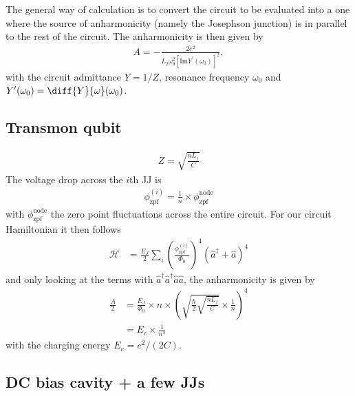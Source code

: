 The general way of calculation is to convert the circuit to be evaluated into a one where the source of anharmonicity (namely the Josephson junction) is in parallel to the rest of the circuit.
The anharmonicity is then given by
\begin{align}
A=-\frac{2e^2}{L_j\omega_0^2\left[\text{Im} Y^\prime(\omega_0)\right]^2},
\end{align}
with the circuit admittance $Y=1/Z$, resonance frequency $\omega_0$ and $Y^\prime(\omega_0)=\diff{Y}{\omega}(\omega_0)$.

\subsection{Transmon qubit}

\begin{align}
Z=\sqrt{\frac{nL_j}{C}}
\end{align}
The voltage drop across the $i$th JJ is
\begin{align}
\phi_\text{zpf}^{(i)} = \frac{1}{n}\times\phi_\text{zpf}^\text{node}
\end{align}
with $\phi_\text{zpf}^\text{node}$ the zero point fluctuations across the entire circuit.
For our circuit Hamiltonian it then follows 
\begin{align}
\mathcal{H}&= \frac{E_J}{2} \sum_{i} \left( \frac{\phi_\text{zpf}^{(i)}}{\Phi_0} \right)^4 \left(\hat{a}^\dagger+\hat{a}\right)^4
\end{align}
and only looking at the terms with $\hat{a}^\dagger \hat{a}^\dagger \hat{a} \hat{a}$, the anharmonicity is given by
\begin{align}
\frac{A}{2} &=\frac{E_J}{\Phi_0}\times n \times \left(\sqrt{\frac{\hbar}{2} \sqrt{\frac{nL_j}{C}}}\times \frac{1}{n}\right)^4  \\
&= E_c \times \frac{1}{n^3}
\end{align}
with the charging energy $E_c=e^2/(2C)$.

\subsection{DC bias cavity + a few JJs}\label{sec:distributed}

